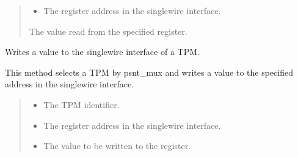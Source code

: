 \documentclass[letterpaper,10pt,english]{sphinxmanual}
\begin{document}
\begin{fulllineitems}
\begin{fulllineitems}
\begin{quote}
\begin{description}
\begin{itemize}
\item {} 
\sphinxAtStartPar
{} \textendash{} The register address in the single\sphinxhyphen{}wire interface.

\end{itemize}

\sphinxAtStartPar
The value read from the specified register.

\end{description}\end{quote}

\end{fulllineitems}


\begin{fulllineitems}
\label{\detokenize{apidocs:subrack_management_board.SubrackMngBoard.write_tpm_singlewire}}
\pysigstartsignatures
{}
\pysigstopsignatures
\sphinxAtStartPar
Writes a value to the single\sphinxhyphen{}wire interface of a TPM.

\sphinxAtStartPar
This method selects a TPM by psnt\_mux and writes a value to the specified
address in the single\sphinxhyphen{}wire interface.
\begin{quote}\begin{description}
\begin{itemize}
\item {} 
\sphinxAtStartPar
{} \textendash{} The TPM identifier.

\item {} 
\sphinxAtStartPar
{} \textendash{} The register address in the single\sphinxhyphen{}wire interface.

\item {} 
\sphinxAtStartPar
{} \textendash{} The value to be written to the register.

\end{itemize}

\end{description}\end{quote}

\end{fulllineitems}


\end{fulllineitems}
\end{document}
